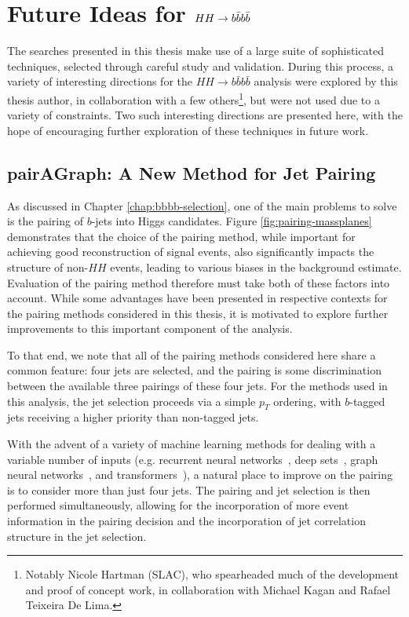 \chapter{Future Ideas for $HH\rightarrow b\bar{b}b\bar{b}$}
\label{app:future}

The searches presented in this thesis make use of a large suite of sophisticated techniques, selected 
through careful study and validation. During this process, a variety of interesting 
directions for the $HH\rightarrow b\bar{b}b\bar{b}$ analysis were explored by this thesis author, 
in collaboration with a few others\footnote{Notably Nicole Hartman (SLAC), who spearheaded much of the 
development and proof of concept work, in collaboration with Michael Kagan and Rafael Teixeira De Lima.}, 
but were not used due to a variety of constraints. Two such interesting directions are presented here, 
with the hope of encouraging further exploration of these techniques in future work.

\section{pairAGraph: A New Method for Jet Pairing}
As discussed in Chapter \ref{chap:bbbb-selection}, one of the main problems to solve is the pairing of 
$b$-jets into Higgs candidates. Figure \ref{fig:pairing-massplanes} demonstrates that the choice 
of the pairing method, while important for achieving good reconstruction of signal events, also 
significantly impacts the structure of non-$HH$ events, leading to various biases in the 
background estimate. Evaluation of the pairing method therefore must take both of these factors 
into account. While some advantages have been presented in respective contexts for the pairing 
methods considered in this thesis, it is motivated to explore further improvements to this important 
component of the analysis.

To that end, we note that all of the pairing methods considered here share a common feature: 
four jets are selected, and the pairing is some discrimination between the available three pairings 
of these four jets. For the methods used in this analysis, the jet selection proceeds via a 
simple $p_{T}$ ordering, with $b$-tagged jets receiving a higher priority than non-tagged jets.

With the advent of a variety of machine learning methods for dealing with a variable number of 
inputs (e.g. recurrent neural networks~\cite{RNNs}, deep sets~\cite{DeepSets}, graph neural networks~\cite{GNNs}, 
and transformers~\cite{Transformers}), a natural place to improve on the 
pairing is to consider more than just four jets. The pairing and jet selection is then performed 
simultaneously, allowing for the incorporation of more event information in the pairing decision and 
the incorporation of jet correlation structure in the jet selection.

